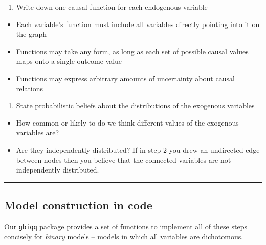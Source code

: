 \documentclass[12pt,]{book}
\providecommand{\tightlist}{%
  \setlength{\itemsep}{0pt}\setlength{\parskip}{0pt}}
\begin{document}
\begin{enumerate}
\def\labelenumi{\arabic{enumi}.}
\setcounter{enumi}{2}
\tightlist
\item
  Write down one causal function for each endogenous variable
\end{enumerate}

\begin{itemize}
\tightlist
\item
  Each variable's function must include all variables directly pointing into it on the graph
\item
  Functions may take any form, as long as each set of possible causal values maps onto a single outcome value
\item
  Functions may express arbitrary amounts of uncertainty about causal relations
\end{itemize}

\begin{enumerate}
\def\labelenumi{\arabic{enumi}.}
\setcounter{enumi}{3}
\tightlist
\item
  State probabilistic beliefs about the distributions of the exogenous variables
\end{enumerate}

\begin{itemize}
\tightlist
\item
  How common or likely to do we think different values of the exogenous variables are?
\item
  Are they independently distributed? If in step 2 you drew an undirected edge between nodes then you believe that the connected variables are not independently distributed.
\end{itemize}

\begin{center}\rule{0.5\linewidth}{\linethickness}\end{center}

\hypertarget{model-construction-in-code}{%
\subsection{Model construction in code}\label{model-construction-in-code}}

Our \texttt{gbiqq} package provides a set of functions to implement all of these steps concisely for \emph{binary} models -- models in which all variables are dichotomous.
\end{document}
